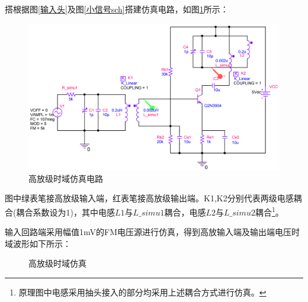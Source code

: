 \documentclass[a4paper,12pt,twoside]{article}
\begin{document}
搭根据图\ref{输入头}及图\ref{小信号sch}搭建仿真电路，如图\ref{高放时域仿真sch}所示：
\begin{figure}[H]
    \centering
    \includegraphics[scale=0.17]{高放级仿真.png}
    \caption{高放级时域仿真电路}
    \label{高放时域仿真sch}
\end{figure}
图中绿表笔接高放级输入端，红表笔接高放级输出端。K1,K2分别代表两级电感耦合(耦合系数设为1)，其中电感$L1$与$L\_simu1$耦合，电感$L2$与$L\_simu2$耦合\footnote{原理图中电感采用抽头接入的部分均采用上述耦合方式进行仿真。}。

输入回路端采用幅值1mV的FM电压源进行仿真，得到高放输入端及输出端电压时域波形如下所示：
\begin{figure}[H]
    \centering
     \hspace{0.01\linewidth}
    \caption{高放级时域仿真}
  \label{高放频域wave}
\end{figure}
\end{document}
